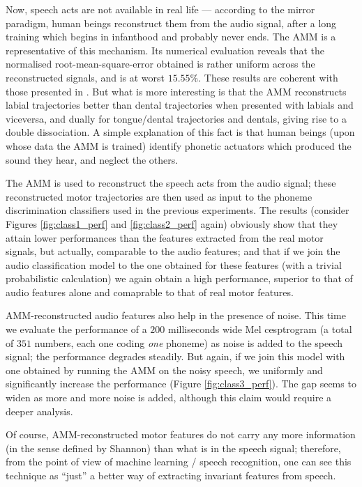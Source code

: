 Now, speech acts are not available in real life --- according to the mirror
paradigm, human beings reconstruct them from the audio signal, after a long
training which begins in infanthood and probably never ends. The AMM is a
representative of this mechanism. Its numerical evaluation
reveals that the normalised root-mean-square-error obtained is rather
uniform across the reconstructed signals, and is at worst $15.55\%$. These
results are coherent with those presented in \cite{papcun,richmond2002,richmond2007}.
But what is more interesting is that the AMM reconstructs labial trajectories
better than dental trajectories when presented with labials and viceversa,
and dually for tongue/dental trajectories and dentals, giving rise to a double
dissociation. A simple explanation of this fact is that human beings
(upon whose data the AMM is trained) identify phonetic actuators which produced
the sound they hear, and neglect the others.

The AMM is used to reconstruct the speech acts from the audio signal; these
reconstructed motor trajectories are then used as input to the phoneme
discrimination classifiers used in the previous experiments. The results
(consider Figures \ref{fig:class1_perf} and \ref{fig:class2_perf} again)
obviously show that they attain lower performances than the features
extracted from the real motor signals, but actually, comparable
to the audio features; and that if we join the audio classification model
to the one obtained for these features (with a trivial probabilistic calculation)
we again obtain a high performance, superior to that of audio features alone
and comaprable to that of real motor features.

AMM-reconstructed audio features also help in the presence of noise. This time
we evaluate the performance of a $200$ milliseconds wide Mel cesptrogram (a total
of $351$ numbers, each one coding \emph{one} phoneme) as noise is added to the
speech signal; the performance degrades steadily. But again, if we join this
model with one obtained by running the AMM on the noisy speech, we uniformly
and significantly increase the performance (Figure \ref{fig:class3_perf}). The
gap seems to widen as more and more noise is added, although this claim would
require a deeper analysis.

Of course, AMM-reconstructed motor features do not carry any more information
(in the sense defined by Shannon) than what is in the speech signal; therefore,
from the point of view of machine learning / speech recognition, one can see
this technique as ``just'' a better way of extracting invariant features from
speech.
